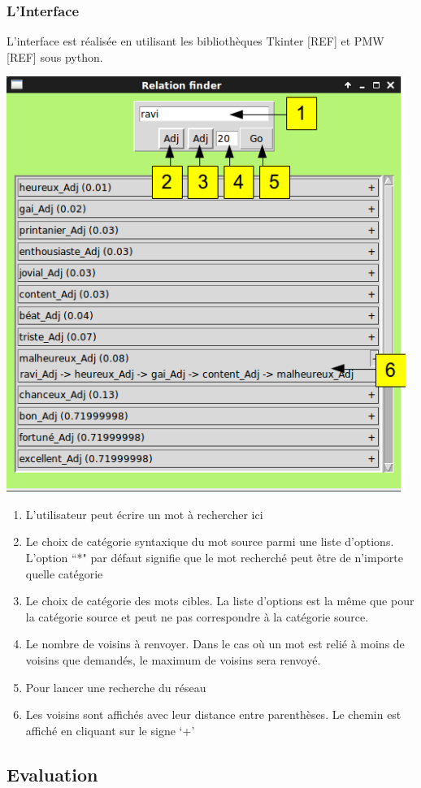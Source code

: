 \subsubsection{L'Interface}

L'interface est réalisée en utilisant les bibliothèques Tkinter [REF] et PMW [REF] sous python.

\begin{center}
\includegraphics[width=13cm]{relationfinderinterface.png}
\end{center}

\begin{enumerate}
    \item{L'utilisateur peut écrire un mot à rechercher ici}
    \item{Le choix de catégorie syntaxique du mot source parmi une liste d'options. L'option ``*" par défaut signifie que le mot recherché peut être de n'importe quelle catégorie}
    \item{Le choix de catégorie des mots cibles. La liste d'options est la même que pour la catégorie source et peut ne pas correspondre à la catégorie source.}
    \item{Le nombre de voisins à renvoyer. Dans le cas où un mot est relié à moins de voisins que demandés, le maximum de voisins sera renvoyé.}
    \item{Pour lancer une recherche du réseau}
    \item{Les voisins sont affichés avec leur distance entre parenthèses. Le chemin est affiché en cliquant sur le signe \lq{+}\rq{}}   

\end{enumerate}



\subsection{Evaluation}
